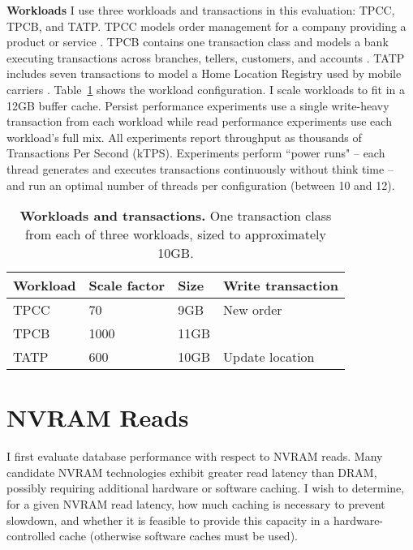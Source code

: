 \textbf{Workloads}
I use three workloads and transactions in this evaluation: TPCC, TPCB, and TATP.
TPCC models order management for a company providing a product or service \cite{TPCC}.
TPCB contains one transaction class and models a bank executing transactions across branches, tellers, customers, and accounts \cite{TPCB}.
TATP includes seven transactions to model a Home Location Registry used by mobile carriers \cite{TATP}.
Table~\ref{table::Workloads} shows the workload configuration.
I scale workloads to fit in a 12GB buffer cache.
Persist performance experiments use a single write-heavy transaction from each workload while read performance experiments use each workload's full mix.
All experiments report throughput as thousands of Transactions Per Second (kTPS).
Experiments perform ``power runs" -- each thread generates and executes transactions continuously without think time -- and run an optimal number of threads per configuration (between 10 and 12).

\begin{table}
  \centering
  \begin{tabular}{l l l l}
    \hline
    Workload & Scale factor & Size & Write transaction \\
    \hline \hline
    TPCC & 70 & 9GB & New order \\
    TPCB & 1000 & 11GB & \\
    TATP & 600 & 10GB & Update location \\
    \hline
  \end{tabular}
  \caption{\textbf{Workloads and transactions.}  One transaction class from each of three workloads, sized to approximately 10GB.}
  \label{table::Workloads}
\end{table}

\section{NVRAM Reads}
\label{sec:OLTP_eval:Reads}

I first evaluate database performance with respect to NVRAM reads.
Many candidate NVRAM technologies exhibit greater read latency than DRAM, possibly requiring additional hardware or software caching.
I wish to determine, for a given NVRAM read latency, how much caching is necessary to prevent slowdown, and whether it is feasible to provide this capacity in a hardware-controlled cache (otherwise software caches must be used).

